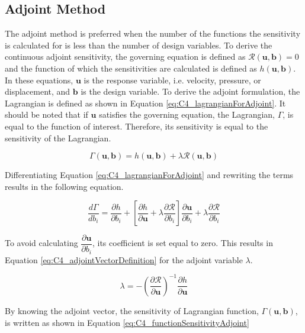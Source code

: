 \subsection{Adjoint Method}
The adjoint method is preferred when the number of the functions the sensitivity is calculated for is less than the number of design variables. To derive the continuous adjoint sensitivity, the governing equation is defined as $\mathcal{R}(\mathbf{u}, \mathbf{b}) = 0$ and the function of which the sensitivities are calculated is defined as $h(\mathbf{u}, \mathbf{b})$. In these equations, $\mathbf{u}$ is the response variable, i.e. velocity, pressure, or displacement, and $\mathbf{b}$ is the design variable. To derive the adjoint formulation, the Lagrangian is defined as shown in Equation \eqref{eq:C4_lagrangianForAdjoint}. It should be noted that if $\mathbf{u}$ satisfies the governing equation, the Lagrangian, $\Gamma$, is equal to the function of interest. Therefore, its sensitivity is equal to the sensitivity of the Lagrangian.

\begin{equation}\label{eq:C4_lagrangianForAdjoint}
    \Gamma(\mathbf{u}, \mathbf{b}) = h(\mathbf{u}, \mathbf{b}) + \lambda \mathcal{R}(\mathbf{u}, \mathbf{b})
\end{equation}

Differentiating Equation \eqref{eq:C4_lagrangianForAdjoint} and rewriting the terms results in the following equation. 

\begin{equation}
    \frac{d \Gamma}{d b_i} = 
    \frac{\partial h}{\partial b_i} + 
    \left[ \frac{\partial h}{\partial \mathbf{u}} + \lambda \frac{\partial \mathcal{R}}{\partial b_i} \right]
    \frac{\partial \textbf{u}}{\partial b_i} + 
    \lambda \frac{\partial \mathcal{R}}{\partial b_i}
\end{equation}

To avoid calculating $\dfrac{\partial \textbf{u}}{\partial b_i}$, its coefficient is set equal to zero. This results in Equation \eqref{eq:C4_adjointVectorDefinition} for the adjoint variable $\lambda$.

\begin{equation}\label{eq:C4_adjointVectorDefinition}
    \lambda = -\left( \frac{\partial \mathcal{R}}{\partial \mathbf{u}} \right)^{-1} \frac{\partial h}{\partial \mathbf{u}}
\end{equation}

By knowing the adjoint vector, the sensitivity of Lagrangian function, $\Gamma(\mathbf{u}, \mathbf{b})$, is written as shown in Equation \eqref{eq:C4_functionSensitivityAdjoint}

